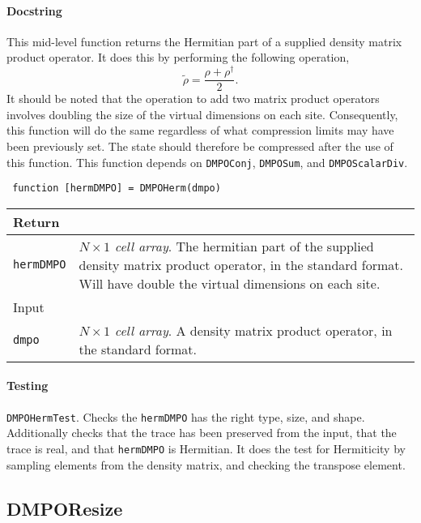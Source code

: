  \paragraph{Docstring} This mid-level function returns the Hermitian part of a supplied density matrix product operator. It does this by performing the following operation, 
 \begin{equation}
 \tilde{\rho} = \frac{\rho + \rho^{\dagger}}{2}.
 \label{eq:vs3-2}
 \end{equation}
 It should be noted that the operation to add two matrix product operators involves doubling the size of the virtual dimensions on each site. Consequently, this function will do the same regardless of what compression limits may have been previously set. The state should therefore be compressed after the use of this function. This function depends on \lstinline$DMPOConj$, \lstinline$DMPOSum$, and \lstinline$DMPOScalarDiv$.
 \begin{lstlisting}
 function [hermDMPO] = DMPOHerm(dmpo) \end{lstlisting}
 \begin{longtabu}{X[1,l]X[4,l]}
 \hline
 Return & \\ \hline
 \lstinline$hermDMPO$ & \emph{\(N \times 1\) cell array}. The hermitian part of the supplied density matrix product operator, in the standard format. Will have double the virtual dimensions on each site. \\ \hline
 Input & \\ \hline
 \lstinline$dmpo$ & \emph{\(N \times 1\) cell array}. A density matrix product operator, in the standard format. \\
 \hline
 \end{longtabu}
 \paragraph{Testing} \lstinline$DMPOHermTest$. Checks the \lstinline$hermDMPO$ has the right type, size, and shape. Additionally checks that the trace has been preserved from the input, that the trace is real, and that \lstinline$hermDMPO$ is Hermitian. It does the test for Hermiticity by sampling elements from the density matrix, and checking the transpose element.

 \subsection{DMPOResize}

